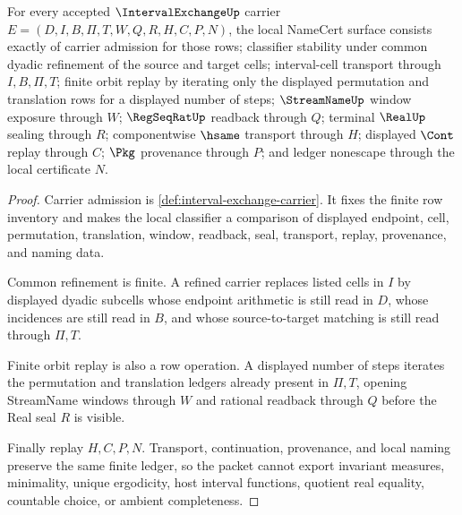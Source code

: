 \begin{theorem}
\label{thm:interval-exchange-namecert-obligations}
For every accepted $\IntervalExchangeUp$ carrier $E=(D,I,B,\Pi,T,W,Q,R,H,C,P,N)$, the local NameCert surface consists exactly of carrier admission for those rows; classifier stability under common dyadic refinement of the source and target cells; interval-cell transport through $I,B,\Pi,T$; finite orbit replay by iterating only the displayed permutation and translation rows for a displayed number of steps; $\StreamNameUp$ window exposure through $W$; $\RegSeqRatUp$ readback through $Q$; terminal $\RealUp$ sealing through $R$; componentwise $\hsame$ transport through $H$; displayed $\Cont$ replay through $C$; $\Pkg$ provenance through $P$; and ledger nonescape through the local certificate $N$.
\end{theorem}
\begin{proof}
Carrier admission is \autoref{def:interval-exchange-carrier}. It fixes the finite row inventory and makes the local classifier a comparison of displayed endpoint, cell, permutation, translation, window, readback, seal, transport, replay, provenance, and naming data.

Common refinement is finite. A refined carrier replaces listed cells in $I$ by displayed dyadic subcells whose endpoint arithmetic is still read in $D$, whose incidences are still read in $B$, and whose source-to-target matching is still read through $\Pi,T$.

Finite orbit replay is also a row operation. A displayed number of steps iterates the permutation and translation ledgers already present in $\Pi,T$, opening StreamName windows through $W$ and rational readback through $Q$ before the Real seal $R$ is visible.

Finally replay $H,C,P,N$. Transport, continuation, provenance, and local naming preserve the same finite ledger, so the packet cannot export invariant measures, minimality, unique ergodicity, host interval functions, quotient real equality, countable choice, or ambient completeness.
\end{proof}

